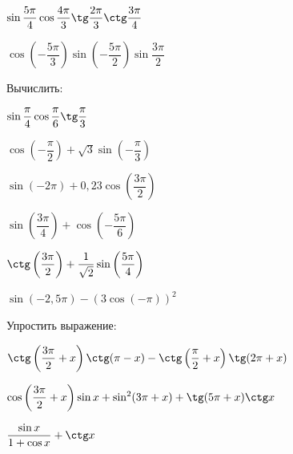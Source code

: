 \begin{class}[number=1]
\begin{listofex}
\begin{enumcols}[itemcolumns=2]
			\item \( \sin\dfrac{5\pi}{4}\cos\dfrac{4\pi}{3}\tg\dfrac{2\pi}{3}\ctg\dfrac{3\pi}{4} \)
			\item \( \cos\left( -\dfrac{5\pi}{3} \right)\sin\left( -\dfrac{5\pi}{2} \right)\sin\dfrac{3\pi}{2} \)
		\end{enumcols}
		\item Вычислить:
		\begin{enumcols}[itemcolumns=2]
			\item \( \sin\dfrac{\pi}{4}\cos\dfrac{\pi}{6}\tg\dfrac{\pi}{3} \)
			\item \( \cos\left( -\dfrac{\pi}{2} \right)+\sqrt{3}\sin\left( -\dfrac{\pi}{3} \right) \)
			\item \( \sin(-2\pi)+0,23\cos\left( \dfrac{3\pi}{2} \right) \)
			\item \( \sin\left( \dfrac{3\pi}{4} \right)+\cos\left( -\dfrac{5\pi}{6} \right) \)
			\item \( \ctg\left( \dfrac{3\pi}{2} \right)+\dfrac{1}{\sqrt{2}}\sin\left( \dfrac{5\pi}{4} \right) \)
			\item \( \sin(-2,5\pi)-(3\cos(-\pi))^2 \)
		\end{enumcols}
		\item Упростить выражение:
		\begin{enumcols}[itemcolumns=1]
			\item \( \ctg\left( \dfrac{3\pi}{2}+x \right)\ctg(\pi-x)-\ctg\left( \dfrac{\pi}{2}+x \right)\tg(2\pi+x) \)
			\item \( \cos\left( \dfrac{3\pi}{2}+x \right)\sin x + \sin^2(3\pi+x)+\tg(5\pi+x)\ctg x \)
			\item \( \dfrac{\sin x}{1+\cos x}+\ctg x \)
		\end{enumcols}
	\end{listofex}
\end{class}
%
%
%
%
